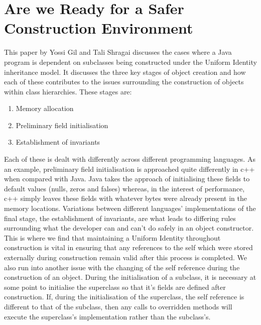 \section{Are we Ready for a Safer Construction Environment~\cite{SaferConstruction}}
This paper by Yossi Gil and Tali Shragai discusses the cases where a Java program is dependent on subclasses being constructed under the Uniform Identity inheritance model. It discusses the three key stages of object creation and how each of these contributes to the issues surrounding the construction of objects within class hierarchies. These stages are:
\begin{enumerate}
	\item Memory allocation
	\item Preliminary field initialisation
	\item Establishment of invariants
\end{enumerate}
Each of these is dealt with differently across different programming languages. As an example, preliminary field initialisation is approached quite differently in c++ when compared with Java. Java takes the approach of initialising these fields to default values (nulls, zeros and falses) whereas, in the interest of performance, c++ simply leaves these fields with whatever bytes were already present in the memory locations. \newline
Variations between different languages’ implementations of the final stage, the establishment of invariants, are what leads to differing rules surrounding what the developer can and can’t do safely in an object constructor. This is where we find that maintaining a Uniform Identity throughout construction is vital in ensuring that any references to the self which were stored externally during construction remain valid after this process is completed. \newline
We also run into another issue with the changing of the self reference during the construction of an object. During the initialisation of a subclass, it is necessary at some point to initialise the superclass so that it’s fields are defined after construction. If, during the initialisation of the superclass, the self reference is different to that of the subclass, then any calls to overridden methods will execute the superclass's implementation rather than the subclass’s.

